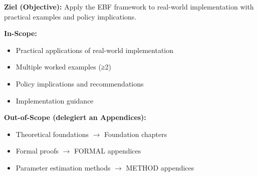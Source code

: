 \begin{tcolorbox}[
    colback=purple!5!white,
    colframe=purple!75!black,
    title={\textbf{Chapter Scope: Ziel / In-Scope / Out-of-Scope}},
    fonttitle=\bfseries
]

\textbf{Ziel (Objective):}
Apply the EBF framework to real-world implementation with practical examples and policy implications.

\vspace{0.3cm}
\textbf{In-Scope:}
\begin{itemize}[nosep]
    \item Practical applications of real-world implementation
    \item Multiple worked examples (≥2)
    \item Policy implications and recommendations
    \item Implementation guidance
\end{itemize}

\vspace{0.3cm}
\textbf{Out-of-Scope (delegiert an Appendices):}
\begin{itemize}[nosep]
    \item Theoretical foundations $\rightarrow$ Foundation chapters
    \item Formal proofs $\rightarrow$ FORMAL appendices
    \item Parameter estimation methods $\rightarrow$ METHOD appendices
\end{itemize}

\end{tcolorbox}



